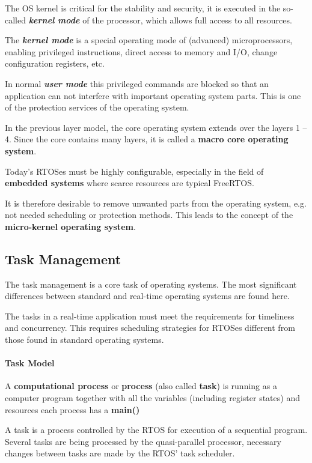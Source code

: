 The OS kernel is critical for the stability and security, it is executed in the so-called \textbf{\textit{kernel mode}} of the processor, which allows full access to all resources.

The \textbf{\textit{kernel mode}} is a special operating mode of (advanced) microprocessors, enabling privileged instructions, direct access to memory and I/O, change configuration registers, etc.

In normal \textbf{\textit{user mode}} this privileged commands are blocked so that an application can not interfere with important operating system parts. This is one of the protection services of the operating system.

In the previous layer model, the core operating system extends over the layers 1 -- 4. Since the core contains many layers, it is called a \textbf{macro core operating system}.

Today's RTOSes must be highly configurable, especially in the field of \textbf{embedded systems} where scarce resources are typical  FreeRTOS.

It is therefore desirable to remove unwanted parts from the operating system, e.g. not needed scheduling or protection methods. This leads to the concept of the \textbf{micro-kernel operating system}.

\subsection{ Task Management}

The task management is a core task of operating systems. The most significant differences between standard and real-time operating systems are found here.

The tasks in a real-time application must meet the requirements for timeliness and concurrency. This requires scheduling strategies for RTOSes different from those found in  standard operating systems.

\paragraph{  Task Model}

A \textbf{computational process} or \textbf{process} (also called \textbf{task}) is running as a computer program together with all the variables (including register states) and resources each process has a \textbf{main()}

A task is a process controlled by the RTOS for execution of a sequential program. Several tasks are being processed by the quasi-parallel processor, necessary changes between tasks are made by the RTOS' task scheduler.

